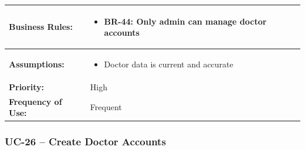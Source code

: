 \documentclass[12pt,a4paper]{article}
\begin{document}
\begin{longtable}{|p{4.5cm}|p{10.5cm}|}
\hline
\textbf{Business Rules:} &
\begin{itemize}
  \item BR-44: Only admin can manage doctor accounts
\end{itemize} \\
\hline
\textbf{Assumptions:} &
\begin{itemize}
  \item Doctor data is current and accurate
\end{itemize} \\
\hline
\textbf{Priority:} & High \\
\hline
\textbf{Frequency of Use:} & Frequent \\
\hline
\end{longtable}

\subsubsection{UC-26 – Create Doctor Accounts}
\end{document}
